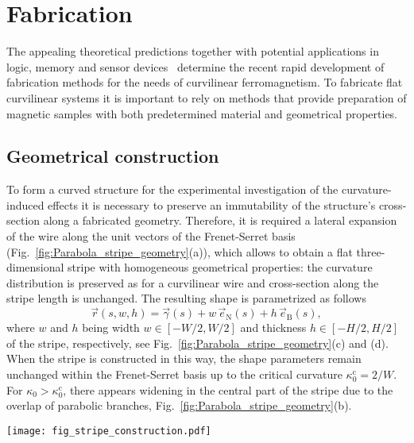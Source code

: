 \section{Fabrication}\label{sec:fabrication}

The appealing theoretical predictions together with potential applications in logic, memory and sensor devices~\cite{Parkin08,Parkin15} determine the recent rapid development of fabrication methods for the needs of curvilinear ferromagnetism. To fabricate flat curvilinear systems it is important to rely on methods that provide preparation of magnetic samples with both predetermined material and geometrical properties.

\subsection{Geometrical construction}

To form a curved structure for the experimental investigation of the curvature-induced effects it is necessary to preserve an immutability of the structure's cross-section along a fabricated geometry. Therefore, it is required a lateral expansion of the wire along the unit vectors of the Frenet-Serret basis (Fig.~\ref{fig:Parabola_stripe_geometry}(a)), which allows to obtain a flat three-dimensional stripe with homogeneous geometrical properties: the curvature distribution is preserved as for a curvilinear
wire and cross-section along the stripe length is unchanged. The resulting shape is parametrized as follows
\begin{equation} \label{eq:Stripe_param}
\vec{r}(s,w,h) = \vec{\gamma}(s) + w \, \vec{e}_\textrm{N}(s) + h \, \vec{e}_\textrm{B}(s),
\end{equation}
where $w$ and $h$ being width $w \in [-W/2,W/2]$ and thickness $h \in [-H/2,H/2]$ of the stripe, respectively, see Fig.~\ref{fig:Parabola_stripe_geometry}(c) and (d). When the stripe is constructed in this way, the shape parameters remain unchanged within the Frenet-Serret basis up to the critical curvature $\kappa^\textrm{c}_0 = 2/W$. For $\kappa_0>\kappa^\textrm{c}_0$, there appears widening in the central part of the stripe due to the overlap of parabolic branches, Fig.~\ref{fig:Parabola_stripe_geometry}(b).

\begin{figure*}
	\begin{center}
		\texttt{[image: fig\_stripe\_construction.pdf]}
	\end{center}
	\caption{\textit{Geometrical construction of a parabolic stripe.}~(a), One-dimensional parabolic wire in a Cartesian frame of reference.~(b), Schematic picture of a parabolic stripe geometry construction from one-dimensional wire expansion along the normal direction $\vec{e}_\textrm{N}$.~(c) and (d), Show the resulting stripe geometries with two different widths $W_1$ and $W_2=2 W_1$, respectively. Local widening in the apex area of the parabolic stripe is indicated by $\Delta W$.}
	\label{fig:Parabola_stripe_geometry}
\end{figure*}	


